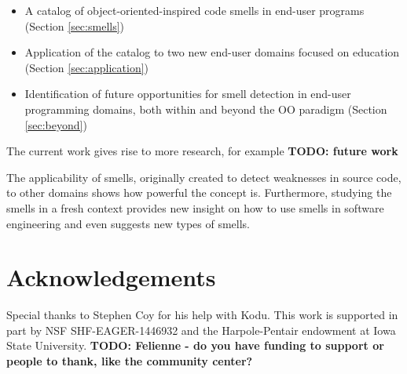 \documentclass{sig-alternate}
\newcommand{\todo}[1]{\textbf{TODO: #1}}
\begin{document}
\begin{itemize}
	\item A catalog of object-oriented-inspired code smells in end-user programs (Section \ref{sec:smells})
	\item Application of the catalog to two new end-user domains focused on education (Section \ref{sec:application})
	\item Identification of future opportunities for smell detection in end-user programming domains, both within and beyond the OO paradigm (Section \ref{sec:beyond})
\end{itemize}

The current work gives rise to more research, for example \todo{future work}

The applicability of smells, originally created to detect weaknesses in source code, to other domains shows how powerful the concept is. Furthermore, studying the smells in a fresh context provides new insight on how to use smells in software engineering and even suggests new types of smells. 

\balance

\section*{Acknowledgements}
Special thanks to Stephen Coy for his help with Kodu. This work is supported in part by  NSF SHF-EAGER-1446932 and the Harpole-Pentair endowment at Iowa State University.
\todo{Felienne - do you have funding to support or people to thank, like the community center?}



\end{document}
